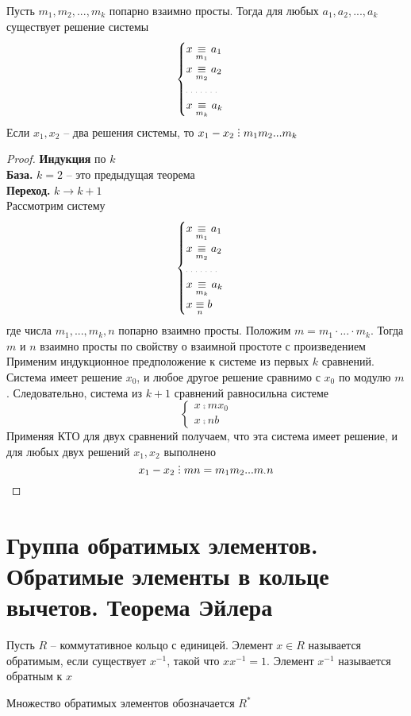 \begin{theorem}
	Пусть $m_1, m_2, ..., m_k$ попарно взаимно просты. Тогда для любых $a_1, a_2, ..., a_k$ существует решение системы
	$$ \begin{cases}
		x \comp{m_1} a_1 \\
		x \comp{m_2} a_2 \\
		\widedots[3em] \\
		x \comp{m_k} a_k
	   \end{cases} $$
	Если $x_1, x_2$ -- два решения системы, то $x_1 - x_2 \divby m_1m_2...m_k$
\end{theorem}

\begin{proof}
	\textbf{Индукция} по $k$ \\
	\textbf{База.} $k = 2$ -- это предыдущая теорема \\
	\textbf{Переход.} $k \to k + 1$ \\
	Рассмотрим систему
	$$ \begin{cases}
		x \comp{m_1} a_1 \\
		x \comp{m_2} a_2 \\
		\widedots[3em] \\
		x \comp{m_k} a_k \\
		x \comp{n} b
	\end{cases} $$
	где числа $m_1, ..., m_k, n$ попарно взаимно просты. Положим $m = m_1 \cdot ... \cdot m_k$. Тогда $m$ и $n$ взаимно просты по свойству о взаимной простоте с произведением \\
	Применим индукционное предположение к системе из первых $k$ сравнений. Система имеет решение $x_0$, и любое другое решение сравнимо с $x_0$ по модулю $m$. Следовательно, система из $k + 1$ сравнений равносильна системе
	$$ \begin{cases}
		x \comp{m} x_0 \\
		x \comp{n} b
	   \end{cases} $$
	Применяя КТО для двух сравнений получаем, что эта система имеет решение, и для любых двух решений $x_1, x_2$ выполнено
	$$ x_1 - x_2 \divby mn = m_1m_2...m_ \cdot n $$
\end{proof}

\section{Группа обратимых элементов. Обратимые элементы в кольце вычетов. Теорема Эйлера}

\begin{definition}
	Пусть $R$ -- коммутативное кольцо с единицей. Элемент $x \in R$ называется обратимым, если существует $x^{-1}$, такой что $xx^{-1} = 1$. Элемент $x^{-1}$ называется обратным к $x$
	\begin{notation}
		Множество обратимых элементов обозначается $R^*$
	\end{notation}
\end{definition}

